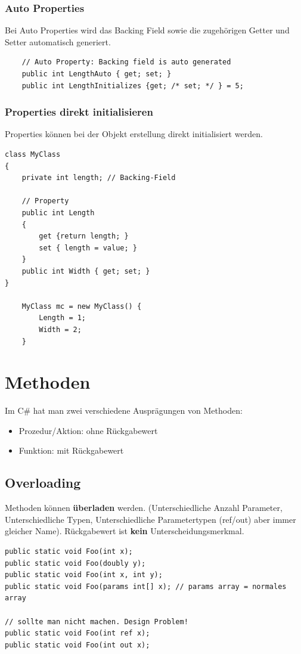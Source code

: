 \documentclass[
a4paper,
oneside,
10pt,
fleqn,
headsepline,
toc=listofnumbered, 
bibliography=totocnumbered]{scrartcl}
\let\stdsection\section
\renewcommand\section{\clearpage\stdsection}
\begin{document}
\subsubsection{Auto Properties}
Bei Auto Properties wird das Backing Field sowie die zugehörigen Getter und Setter automatisch generiert.
\begin{lstlisting}
	// Auto Property: Backing field is auto generated
	public int LengthAuto { get; set; }
	public int LengthInitializes {get; /* set; */ } = 5;
\end{lstlisting}

\subsubsection{Properties direkt initialisieren}
Properties können bei der Objekt erstellung direkt initialisiert werden.
\begin{lstlisting}
class MyClass
{
    private int length; // Backing-Field
    
    // Property
    public int Length 
    {
        get {return length; }
        set { length = value; } 
    }
    public int Width { get; set; } 
} 

	MyClass mc = new MyClass() {
		Length = 1;
		Width = 2;
	}
\end{lstlisting}

\section{Methoden}
Im C\# hat man zwei verschiedene Ausprägungen von Methoden:
\begin{itemize}
	\item Prozedur/Aktion: ohne Rückgabewert
	\item Funktion: mit Rückgabewert
\end{itemize}
\subsection{Overloading}
Methoden können \textbf{überladen} werden. (Unterschiedliche Anzahl Parameter, Unterschiedliche Typen, Unterschiedliche Parametertypen (ref/out) aber immer gleicher Name). Rückgabewert ist \textbf{kein} Unterscheidungsmerkmal.
\begin{lstlisting}
public static void Foo(int x);
public static void Foo(doubly y);
public static void Foo(int x, int y);
public static void Foo(params int[] x); // params array = normales array

// sollte man nicht machen. Design Problem!
public static void Foo(int ref x);
public static void Foo(int out x);
\end{lstlisting}
\end{document}
